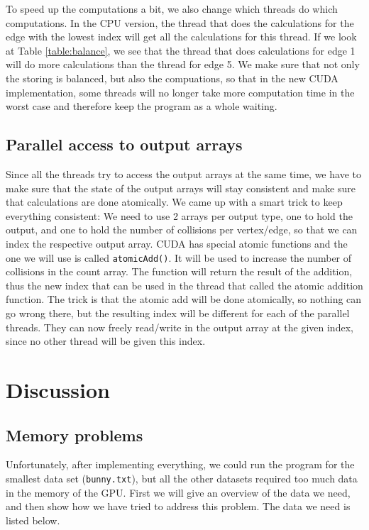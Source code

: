 To speed up the computations a bit, we also change which threads do which computations. In the CPU version, the thread that does the calculations for the edge with the lowest index will get all the calculations for this thread. If we look at Table \ref{table:balance}, we see that the thread that does calculations for edge 1 will do more calculations than the thread for edge 5. We make sure that not only the storing is balanced, but also the compuations, so that in the new CUDA implementation, some threads will no longer take more computation time in the worst case and therefore keep the program as a whole waiting.

\subsection{Parallel access to output arrays}
Since all the threads try to access the output arrays at the same time, we have to make sure that the state of the output arrays will stay consistent and make sure that calculations are done atomically. We came up with a smart trick to keep everything consistent: We need to use 2 arrays per output type, one to hold the output, and one to hold the number of collisions per vertex/edge, so that we can index the respective output array. CUDA has special atomic functions and the one we will use is called \texttt{atomicAdd()}. It will be used to increase the number of collisions in the count array. The function will return the result of the addition, thus the new index that can be used in the thread that called the atomic addition function. The trick is that the atomic add will be done atomically, so nothing can go wrong there, but the resulting index will be different for each of the parallel threads. They can now freely read/write in the output array at the given index, since no other thread will be given this index.

\section{Discussion}
\subsection{Memory problems}
Unfortunately, after implementing everything, we could run the program for the smallest data set (\texttt{bunny.txt}), but all the other datasets required too much data in the memory of the GPU. First we will give an overview of the data we need, and then show how we have tried to address this problem. The data we need is listed below.

